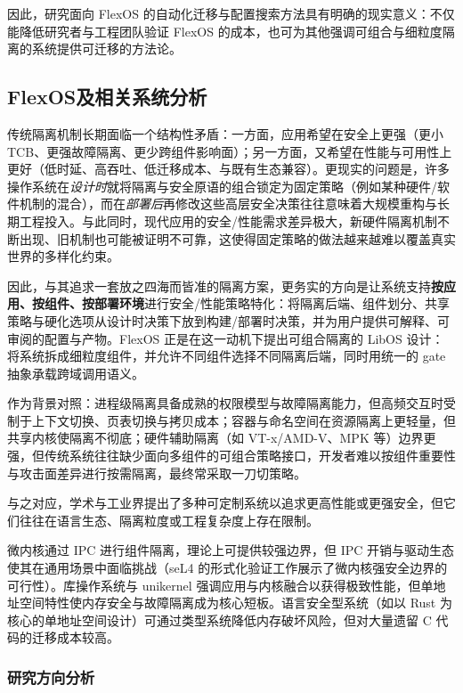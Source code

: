 \documentclass[UTF8,a4paper,12pt,twoside]{ctexart}  %
\begin{document}
因此，研究面向 FlexOS
的自动化迁移与配置搜索方法具有明确的现实意义：不仅能降低研究者与工程团队验证
FlexOS
的成本，也可为其他强调可组合与细粒度隔离的系统提供可迁移的方法论。

\subsection{FlexOS及相关系统分析}

传统隔离机制长期面临一个结构性矛盾：一方面，应用希望在安全上更强（更小 TCB、更强故障隔离、更少跨组件影响面）；另一方面，又希望在性能与可用性上更好（低时延、高吞吐、低迁移成本、与既有生态兼容）。更现实的问题是，许多操作系统在\emph{设计时}就将隔离与安全原语的组合锁定为固定策略（例如某种硬件/软件机制的混合），而在\emph{部署后}再修改这些高层安全决策往往意味着大规模重构与长期工程投入\cite{1,2}。与此同时，现代应用的安全/性能需求差异极大，新硬件隔离机制不断出现、旧机制也可能被证明不可靠，这使得固定策略的做法越来越难以覆盖真实世界的多样化约束\cite{1,2}。

因此，与其追求一套放之四海而皆准的隔离方案，更务实的方向是让系统支持\textbf{按应用、按组件、按部署环境}进行安全/性能策略特化：将隔离后端、组件划分、共享策略与硬化选项从设计时决策下放到构建/部署时决策，并为用户提供可解释、可审阅的配置与产物\cite{1,2}。FlexOS 正是在这一动机下提出可组合隔离的 LibOS 设计：将系统拆成细粒度组件，并允许不同组件选择不同隔离后端，同时用统一的 gate 抽象承载跨域调用语义\cite{1,2}。

作为背景对照：进程级隔离具备成熟的权限模型与故障隔离能力，但高频交互时受制于上下文切换、页表切换与拷贝成本；容器与命名空间在资源隔离上更轻量，但共享内核使隔离不彻底；硬件辅助隔离（如 VT-x/AMD-V、MPK 等）边界更强，但传统系统往往缺少面向多组件的可组合策略接口，开发者难以按组件重要性与攻击面差异进行按需隔离，最终常采取一刀切策略\cite{7,8,19}。

与之对应，学术与工业界提出了多种可定制系统以追求更高性能或更强安全，但它们往往在语言生态、隔离粒度或工程复杂度上存在限制。

微内核通过 IPC 进行组件隔离，理论上可提供较强边界，但 IPC
开销与驱动生态使其在通用场景中面临挑战（seL4
的形式化验证工作展示了微内核强安全边界的可行性）\cite{20}。库操作系统与
unikernel
强调应用与内核融合以获得极致性能，但单地址空间特性使内存安全与故障隔离成为核心短板\cite{4,6,21,22}。语言安全型系统（如以 Rust 为核心的单地址空间设计）可通过类型系统降低内存破坏风险，但对大量遗留 C 代码的迁移成本较高。

\subsubsection{研究方向分析}
\end{document}
